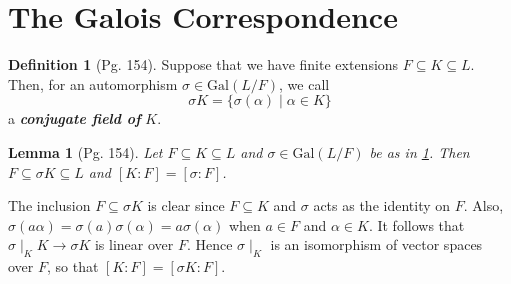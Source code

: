 \documentclass[leqno]{article}
\makeatletter
\newtheorem{lemma}{Lemma}
\theoremstyle{definition}
\newtheorem{definition}{Definition}
\theoremstyle{remark}
\let\oldproofname=\proofname
\renewcommand{\proofname}{\textit{\oldproofname}}
\theoremstyle{definition}
\renewenvironment{proof}[1][\proofname]{\par
  \pushQED{\qed}%
  \normalfont \topsep6\p@\@plus6\p@\relax
  \list{}{\leftmargin=0mm
          \rightmargin=0mm
          \settowidth{\itemindent}{\itshape#1}%
          \labelwidth=\itemindent
          \parsep=0pt \listparindent=0mm%
  }
  \item[\hskip\labelsep
        \itshape
    #1\@addpunct{.}]\ignorespaces
}{%
  \popQED\endlist\@endpefalse
}
\makeatother
\begin{document}
\section{The Galois Correspondence}
    \begin{definition}[Pg. 154]\label{def:13}
        Suppose that we have finite extensions $F\subseteq K\subseteq L$. Then, for an automorphism $\sigma\in\text{Gal}(L/F)$, we call 
            \begin{equation*}
                \sigma K=\{\sigma(\alpha)\mid \alpha\in K\}
            \end{equation*}
        a \textbf{\textit{conjugate field of}} $K$.
    \end{definition}
    \begin{lemma}[Pg. 154]\label{lem:14}
        Let $F\subseteq K\subseteq L$ and $\sigma\in\text{Gal}(L/F)$ be as in \cref{def:13}. Then $F\subseteq \sigma K\subseteq L$ and $[K\colon F]=[\sigma\colon F]$.
    \end{lemma}
        \begin{proof}
            The inclusion $F\subseteq \sigma K$ is clear since $F\subseteq K$ and $\sigma$ acts as the identity on $F$. Also, $\sigma(a\alpha)=\sigma(a)\sigma(\alpha)=a\sigma(\alpha)$ when $a\in F$ and $\alpha\in K$. It follows that $\sigma\mid_K K\rightarrow\sigma K$ is linear over $F$. Hence $\sigma\mid_K$ is an isomorphism of vector spaces over $F$, so that $[K\colon F]=[\sigma K\colon F]$. 
        \end{proof}
\end{document}
